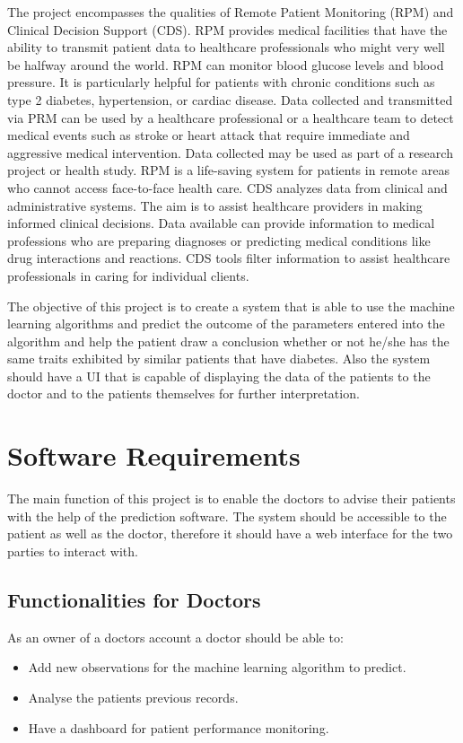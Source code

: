 \documentclass[12pt]{article}
\begin{document}
The project encompasses the qualities of Remote Patient Monitoring (RPM) and Clinical Decision Support (CDS). RPM provides medical facilities that have the ability to transmit patient data to healthcare professionals who might very well be halfway around the world. RPM can monitor blood glucose levels and blood pressure. It is particularly helpful for patients with chronic conditions such as type 2 diabetes, hypertension, or cardiac disease. Data collected and transmitted via PRM can be used by a healthcare professional or a healthcare team to detect medical events such as stroke or heart attack that require immediate and aggressive medical intervention. Data collected may be used as part of a research project or health study. RPM is a life-saving system for patients in remote areas who cannot access face-to-face health care. CDS analyzes data from clinical and administrative systems. The aim is to assist healthcare providers in making informed clinical decisions. Data available can provide information to medical professions who are preparing diagnoses or predicting medical conditions like drug interactions and reactions. CDS tools filter information to assist healthcare professionals in caring for individual clients. 

The objective of this project is to create a  system that is able to use the machine learning algorithms and predict the outcome of the parameters entered into the algorithm and help the patient draw a conclusion whether or not he/she has the same traits exhibited by similar patients that have diabetes. Also the system should have a UI that is capable of displaying the data of the patients to the doctor and to the patients themselves for further interpretation.

\newpage
\section{Software Requirements}
The main function of this project is to enable the doctors to advise their patients with the help of the prediction software. The system should be accessible to the patient as well as the doctor, therefore it should have a web interface for the two parties to interact with.

\subsection{Functionalities for Doctors}
As an owner of a doctors account a doctor should be able to:
\begin{itemize}
\item Add new observations for the machine learning algorithm to predict.
\item Analyse the patients previous records.
\item Have a dashboard for patient performance monitoring.
\end{itemize}
\end{document}
